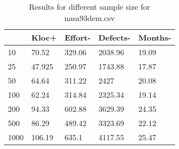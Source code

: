 \begin{table}[]
  \begin{center}
  \begin{tabular}{lllll}
       & Kloc+  & Effort- & Defects- & Months- \\
  \hline
  10   & 70.52  & 329.06  & 2038.96  & 19.09   \\
  25   & 47.925 & 250.97  & 1743.88  & 17.87   \\
  50   & 64.64  & 311.22  & 2427     & 20.08   \\
  100  & 62.24  & 314.84  & 2325.34  & 19.14   \\
  200  & 94.33  & 602.88  & 3629.39  & 24.35   \\
  500  & 86.29  & 489.42  & 3323.69  & 22.12   \\
  1000 & 106.19 & 635.1   & 4117.55  & 25.47  
  \end{tabular}
\end{center}
\caption{Results for different sample size for nasa93dem.csv}
\label{tab:sample_nasa93dem}
  \end{table}